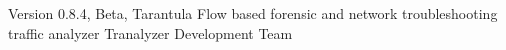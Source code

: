 \documentclass[documentation]{subfiles}
\begin{document}
\trantitle
    {Version 0.8.4, Beta, Tarantula}
    {Flow based forensic and network troubleshooting traffic analyzer}
    {Tranalyzer Development Team}

\end{document}
